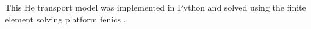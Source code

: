 

This He transport model was implemented in Python and solved using the finite element solving platform \gls{fenics} .
